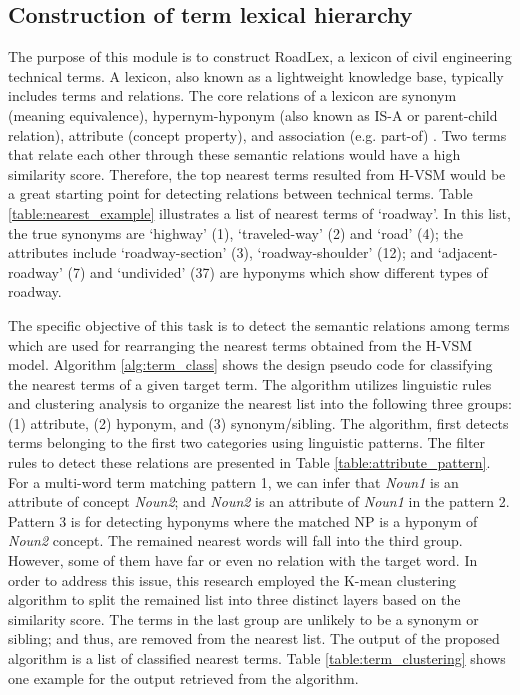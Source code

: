 \documentclass[Journal, BackFigs, DoubleSpace]{ascelike}%
\begin{document}
\subsection{Construction of term lexical hierarchy}
The purpose of this module is to construct RoadLex, a lexicon of civil engineering technical terms. A lexicon, also known as a lightweight knowledge base, typically includes terms and relations. The core relations of a lexicon are synonym (meaning equivalence), hypernym-hyponym (also known as IS-A or parent-child relation), attribute (concept property), and association (e.g. part-of) \cite{jiang1997semantic,lee13}. Two terms that relate each other through these semantic relations would have a high similarity score. Therefore, the top nearest terms resulted from H-VSM would be a great starting point for detecting relations between technical terms. Table \ref{table:nearest_example} illustrates a list of nearest terms of `roadway'. In this list, the true synonyms are `highway' (1), `traveled-way' (2) and `road' (4); the attributes include `roadway-section' (3), `roadway-shoulder' (12); and `adjacent-roadway' (7) and `undivided' (37) are hyponyms which show different types of roadway.
\par
The specific objective of this task is to detect the semantic relations among terms which are used for rearranging the nearest terms obtained from the H-VSM model. Algorithm \ref{alg:term_class} shows the design pseudo code for classifying the nearest terms of a given target term. The algorithm utilizes linguistic rules and clustering analysis to organize the nearest list into the following three groups: (1) attribute, (2) hyponym, and (3) synonym/sibling. The algorithm, first detects terms belonging to the first two categories using linguistic patterns. The filter rules to detect these relations are presented in Table \ref{table:attribute_pattern}. For a multi-word term matching pattern 1, we can infer that \textit{Noun1} is an attribute of concept \textit{Noun2}; and \textit{Noun2} is an attribute of \textit{Noun1} in the pattern 2. Pattern 3 is for detecting hyponyms where the matched NP is a hyponym of \textit{Noun2} concept.  The remained nearest words will fall into the third group. However, some of them have far or even no relation with the target word. In order to address this issue, this research employed the K-mean clustering algorithm \cite{macqueen67} to split the remained list into three distinct layers based on the similarity score. The terms in the last group are unlikely to be a synonym or sibling; and thus, are removed from the nearest list. The output of the proposed algorithm is a list of classified nearest terms. Table \ref{table:term_clustering} shows one example for the output retrieved from the algorithm. 
\end{document}
